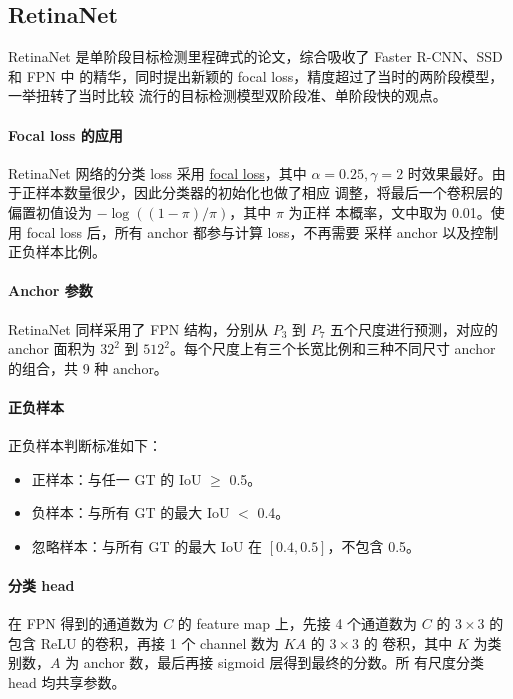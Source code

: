 \subsection{RetinaNet}\label{sub:RetinaNet}

RetinaNet 是单阶段目标检测里程碑式的论文，综合吸收了 Faster R-CNN、SSD 和 FPN 中
的精华，同时提出新颖的 focal loss，精度超过了当时的两阶段模型，一举扭转了当时比较
流行的目标检测模型双阶段准、单阶段快的观点。

\paragraph{Focal loss 的应用}
RetinaNet 网络的分类 loss 采用 \hyperref[subsec:focal]{focal loss}，其中 $\alpha
= 0.25, \gamma = 2$ 时效果最好。由于正样本数量很少，因此分类器的初始化也做了相应
调整，将最后一个卷积层的偏置初值设为 $-\log((1 - \pi)/\pi)$，其中 $\pi$ 为正样
本概率，文中取为 0.01。使用 focal loss 后，所有 anchor 都参与计算 loss，不再需要
采样 anchor 以及控制正负样本比例。

\paragraph{Anchor 参数}
RetinaNet 同样采用了 FPN 结构，分别从 $P_3$ 到 $P_7$ 五个尺度进行预测，对应的
anchor 面积为 $32^2$ 到 $512^2$。每个尺度上有三个长宽比例和三种不同尺寸 anchor
的组合，共 9 种 anchor。

\paragraph{正负样本}
正负样本判断标准如下：
\begin{itemize}
  \item 正样本：与任一 GT 的 IoU $\geq$ 0.5。
  \item 负样本：与所有 GT 的最大 IoU $ < $ 0.4。
  \item 忽略样本：与所有 GT 的最大 IoU 在 $[0.4, 0.5]$，不包含 0.5。
\end{itemize}

\paragraph{分类 head}
在 FPN 得到的通道数为 $C$ 的 feature map 上，先接 4 个通道数为 $C$ 的
$3 \times 3$ 的包含 ReLU 的卷积，再接 1 个 channel 数为 $KA$ 的 $3 \times 3$ 的
卷积，其中 $K$ 为类别数，$A$ 为 anchor 数，最后再接 sigmoid 层得到最终的分数。所
有尺度分类 head 均共享参数。

